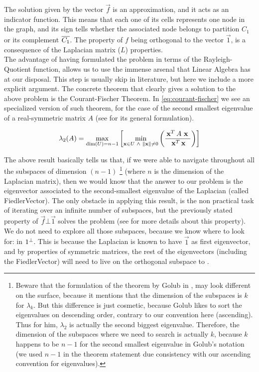 The solution given by the vector $\vec{f}$ is an approximation, and it acts
as an indicator function. This means that each one of its cells
represents one node in the graph, and its sign tells whether the
associated node belongs to 
partition $C_1$ or its complement $\overline{C_1}$. The property of $f$
being orthogonal to the vector $\vec{1}$, is a consequence of the
\gls{Laplacian} matrix ($L$) properties. \\

The advantage of having formulated the problem in terms of the
Rayleigh-Quotient function, allows us to use the immense arsenal that
Linear Algebra has at our disposal. This step is usually skip in
literature, but here we include a more explicit argument. The concrete
theorem that clearly gives a solution to the above problem is the
Courant-Fischer Theorem. In \cref{eq:courant-fischer} we see an
specialized version of such theorem, for the case of the second 
smallest eigenvalue of a real-symmetric matrix $A$ (see \cite{golub13}
for its general formulation).

\begin{equation}
  \label{eq:courant-fischer}
  \lambda_2(A) =
  \max\limits_{\operatorname{dim}(U) = n-1}
  \left[
    \min\limits_{\mathbf{x} \in U \,\,\land\,\, \left\lVert \mathbf{x} \right\rVert \ne 0}
    \left(  
    \dfrac{\,{\mathbf{x}}^{T}\, A \,\,\mathbf{x}\,\,}{\,{\mathbf{x}}^{T}\, \mathbf{x}}
    \right)
    \right]
\end{equation}
\joinbelow{1cm}

The above result basically tells us that, if we were able to navigate
throughout all the subspaces of dimension $(n-1)$
\footnote{Beware that the formulation of the theorem by Golub in
  \cite{golub13}, may look different on the surface, because it
  mentions that the dimension of the subspaces is $k$ for $\lambda_k$. But
this difference is just cosmetic, because Golub likes to sort the
eigenvalues on descending order, contrary to our convention here
(ascending). Thus for him, $\lambda_2$ is actually
the second biggest eigenvalue. Therefore, the dimension of the
subspaces where we need to search is actually $k$, because $k$ happens
to be $n-1$ for the second smallest eigenvalue in Golub's notation (we
used $n-1$ in the theorem statement due consistency with our ascending
convention for eigenvalues).} 
(where $n$ is the
dimension of the \gls{Laplacian} matrix), then we would know that the answer
to our problem is the eigenvector associated to the second-smallest
eigenvalue of the \gls{Laplacian} (called \gls{FiedlerVector}). The only obstacle
in applying this result, is the non practical task of iterating
over an infinite number of subspaces, but the previously stated
property of $\vec{f} \bot \vec{1}$ solves the problem (see
\cite{luxburg07} for more details about this property). We do not need to
explore all those subspaces, because we know where to look for: in
${1}^{\bot}$. This is because the \gls{Laplacian} is known to have $\vec{1}$ as first
eigenvector, and by properties of symmetric matrices, the rest of the
eigenvectors (including the \gls{FiedlerVector}) will need to live on the
orthogonal subspace to . 

